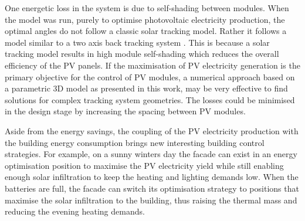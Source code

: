 
One energetic loss in the system is due to self-shading between modules. When the model was run, purely to optimise photovoltaic electricity production, the optimal angles do not follow a classic solar tracking model. Rather it follows a model similar to a two axis back tracking system \cite{lorenzo2011tracking}. This is because a solar tracking model results in high module self-shading which reduces the overall efficiency of the PV panels. If the maximisation of PV electricity generation is the primary objective for the control of PV modules, a numerical approach based on a parametric 3D model as presented in this work, may be very effective to find solutions for complex tracking system geometries. The losses could be minimised in the design stage by increasing the spacing between PV modules.

Aside from the energy savings, the coupling of the PV electricity production with the building energy consumption brings new interesting building control strategies. For example, on a sunny winters day the facade can exist in an energy optimisation position to maximise the PV electricity yield while still enabling enough solar infiltration to keep the heating and lighting demands low. When the batteries are full, the facade can switch its optimisation strategy to positions that maximise the solar infiltration to the building, thus raising the thermal mass and reducing the evening heating demands. 

